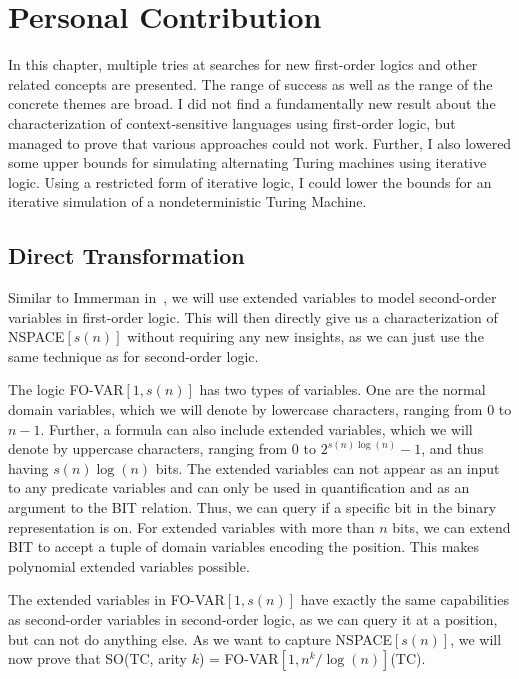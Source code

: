 \chapter{Personal Contribution}\label{ch:personal-contribution}

In this chapter, multiple tries at searches for new first-order logics and other related concepts are presented.
The range of success as well as the range of the concrete themes are broad.
I did not find a fundamentally new result about the characterization of context-sensitive languages using first-order logic, but managed to prove that various approaches could not work.
Further, I also lowered some upper bounds for simulating alternating Turing machines using iterative logic.
Using a restricted form of iterative logic, I could lower the bounds for an iterative simulation of a nondeterministic Turing Machine.

\section{Direct Transformation}\label{sec:direct-transformation}

Similar to Immerman in~\cite{descriptive-complexity}, we will use extended variables to model second-order variables in first-order logic.
This will then directly give us a characterization of NSPACE$[s(n)]$ without requiring any new insights, as we can just use the same technique as for second-order logic.

\begin{define}
    The logic FO-VAR$[1, s(n)]$ has two types of variables.
    One are the normal domain variables, which we will denote by lowercase characters, ranging from $0$ to $n - 1$.
    Further, a formula can also include extended variables, which we will denote by uppercase characters, ranging from $0$ to $2^{s(n)\log(n)} - 1$, and thus having $s(n)\log(n)$ bits.
    The extended variables can not appear as an input to any predicate variables and can only be used in quantification and as an argument to the BIT relation.
    Thus, we can query if a specific bit in the binary representation is on.
    For extended variables with more than $n$ bits, we can extend BIT to accept a tuple of domain variables encoding the position.
    This makes polynomial extended variables possible.
\end{define}

The extended variables in FO-VAR$[1, s(n)]$ have exactly the same capabilities as second-order variables in second-order logic, as we can query it at a position, but can not do anything else.
As we want to capture NSPACE$[s(n)]$, we will now prove that SO(TC, arity $k$) = FO-VAR$[1, n^k/\log(n)]$(TC).

